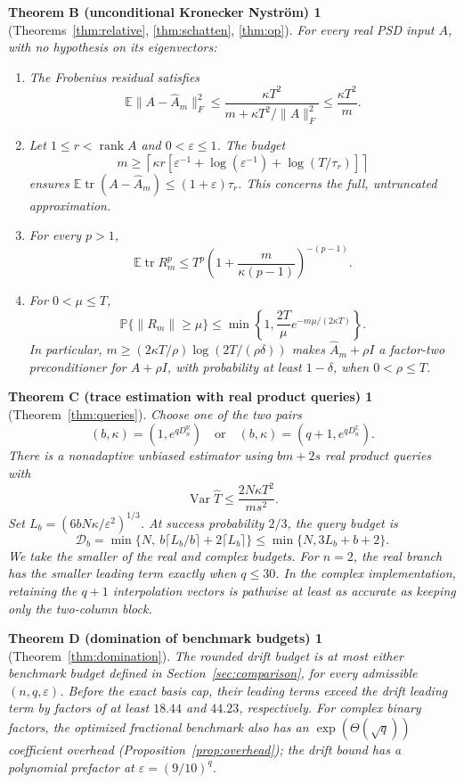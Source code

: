 \documentclass[11pt,a4paper]{article}
\newtheorem*{thmB}{Theorem B (unconditional Kronecker Nystr\"om)}
\newtheorem*{thmC}{Theorem C (trace estimation with real product queries)}
\newtheorem*{thmD}{Theorem D (domination of benchmark budgets)}
\theoremstyle{definition}\newtheorem{definition}[theorem]{Definition}
\theoremstyle{remark}\newtheorem{remark}[theorem]{Remark}
\numberwithin{equation}{section}
\newcommand{\E}{\mathbb E}
\newcommand{\Prob}{\mathbb P}
\newcommand{\R}{\mathbb R}
\newcommand{\C}{\mathbb C}
\newcommand{\tr}{\operatorname{tr}}
\newcommand{\rank}{\operatorname{rank}}
\newcommand{\Var}{\operatorname{Var}}
\newcommand{\eps}{\varepsilon}
\begin{document}
\begin{thmB}[Theorems~\ref{thm:relative}, \ref{thm:schatten}, \ref{thm:op}]
For every real PSD input \(A\), with no hypothesis on its eigenvectors:
\begin{enumerate}[label=(\roman*)]
\item The Frobenius residual satisfies
\[
 \E\|A-\widehat A_m\|_F^2
 \le\frac{\kappa T^2}{m+\kappa T^2/\|A\|_F^2}
 \le\frac{\kappa T^2}{m}.
\]
\item Let \(1\le r<\rank A\) and \(0<\eps\le1\).
The budget
\[
 m\ge\left\lceil\kappa r\left[
 \eps^{-1}+\log(\eps^{-1})+\log(T/\tau_r)
 \right]\right\rceil
\]
ensures \(\E\tr(A-\widehat A_m)\le(1+\eps)\tau_r\).
This concerns the full, untruncated approximation.
\item For every \(p>1\),
\[
 \E\tr R_m^p
 \le T^p\left(1+\frac{m}{\kappa(p-1)}\right)^{-(p-1)}.
\]
\item For \(0<\mu\le T\),
\[
 \Prob\{\|R_m\|\ge\mu\}
 \le\min\left\{1,\frac{2T}{\mu}
           e^{-m\mu/(2\kappa T)}\right\}.
\]
In particular, \(m\ge(2\kappa T/\rho)\log(2T/(\rho\delta))\)
makes \(\widehat A_m+\rho I\) a factor-two preconditioner for
\(A+\rho I\), with probability at least \(1-\delta\), when \(0<\rho\le T\).
\end{enumerate}
\end{thmB}

\begin{thmC}[Theorem~\ref{thm:queries}]
Choose one of the two pairs
\[
 (b,\kappa)=(1,e^{qD_n^{\R}})
 \quad\text{or}\quad
 (b,\kappa)=(q+1,e^{qD_n^{\C}}).
\]
There is a nonadaptive unbiased estimator using \(bm+2s\) real product
queries with
\[
 \Var\widehat T\le\frac{2N\kappa T^2}{ms^2}.
\]
Set \(L_b=(6bN\kappa/\eps^2)^{1/3}\). At success probability \(2/3\),
the query budget is
\[
 \mathcal D_b=\min\{N,\ b\lceil L_b/b\rceil+2\lceil L_b\rceil\}
 \le\min\{N,3L_b+b+2\}.
\]
We take the smaller of the real and complex budgets.
For \(n=2\), the real branch has the smaller leading term exactly when
\(q\le30\). In the complex implementation, retaining the \(q+1\)
interpolation vectors is pathwise at least as accurate as keeping only
the two-column block.
\end{thmC}

\begin{thmD}[Theorem~\ref{thm:domination}]
The rounded drift budget is at most either benchmark budget defined
in Section~\ref{sec:comparison}, for every admissible \((n,q,\eps)\).
Before the exact basis cap, their leading terms exceed the drift
leading term by factors of at least \(18.44\) and \(44.23\), respectively.
For complex binary factors, the optimized fractional benchmark also
has an \(\exp(\Theta(\sqrt q))\) coefficient overhead
(Proposition~\ref{prop:overhead}); the drift bound has a polynomial
prefactor at \(\eps=(9/10)^q\).
\end{thmD}
\end{document}
